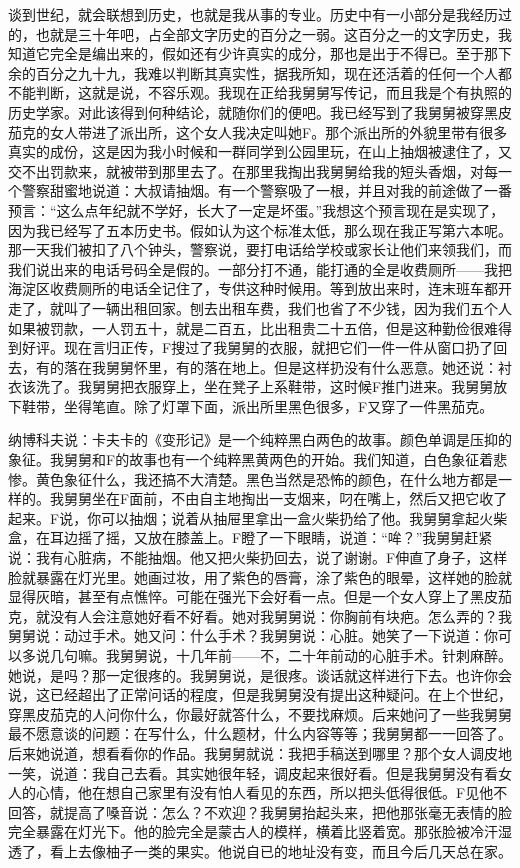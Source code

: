 谈到世纪，就会联想到历史，也就是我从事的专业。历史中有一小部分是我经历过的，也就是三十年吧，占全部文字历史的百分之一弱。这百分之一的文字历史，我知道它完全是编出来的，假如还有少许真实的成分，那也是出于不得已。至于那下余的百分之九十九，我难以判断其真实性，据我所知，现在还活着的任何一个人都不能判断，这就是说，不容乐观。我现在正给我舅舅写传记，而且我是个有执照的历史学家。对此该得到何种结论，就随你们的便吧。我已经写到了我舅舅被穿黑皮茄克的女人带进了派出所，这个女人我决定叫她F。那个派出所的外貌里带有很多真实的成份，这是因为我小时候和一群同学到公园里玩，在山上抽烟被逮住了，又交不出罚款来，就被带到那里去了。在那里我掏出我舅舅给我的短头香烟，对每一个警察甜蜜地说道：大叔请抽烟。有一个警察吸了一根，并且对我的前途做了一番预言：“这么点年纪就不学好，长大了一定是坏蛋。”我想这个预言现在是实现了，因为我已经写了五本历史书。假如认为这个标准太低，那么现在我正写第六本呢。那一天我们被扣了八个钟头，警察说，要打电话给学校或家长让他们来领我们，而我们说出来的电话号码全是假的。一部分打不通，能打通的全是收费厕所——我把海淀区收费厕所的电话全记住了，专供这种时候用。等到放出来时，连末班车都开走了，就叫了一辆出租回家。刨去出租车费，我们也省了不少钱，因为我们五个人如果被罚款，一人罚五十，就是二百五，比出租贵二十五倍，但是这种勤俭很难得到好评。现在言归正传，F搜过了我舅舅的衣服，就把它们一件一件从窗口扔了回去，有的落在我舅舅怀里，有的落在地上。但是这样扔没有什么恶意。她还说：衬衣该洗了。我舅舅把衣服穿上，坐在凳子上系鞋带，这时候F推门进来。我舅舅放下鞋带，坐得笔直。除了灯罩下面，派出所里黑色很多，F又穿了一件黑茄克。 

纳博科夫说：卡夫卡的《变形记》是一个纯粹黑白两色的故事。颜色单调是压抑的象征。我舅舅和F的故事也有一个纯粹黑黄两色的开始。我们知道，白色象征着悲惨。黄色象征什么，我还搞不大清楚。黑色当然是恐怖的颜色，在什么地方都是一样的。我舅舅坐在F面前，不由自主地掏出一支烟来，叼在嘴上，然后又把它收了起来。F说，你可以抽烟；说着从抽屉里拿出一盒火柴扔给了他。我舅舅拿起火柴盒，在耳边摇了摇，又放在膝盖上。F瞪了一下眼睛，说道：“哞？”我舅舅赶紧说：我有心脏病，不能抽烟。他又把火柴扔回去，说了谢谢。F伸直了身子，这样脸就暴露在灯光里。她画过妆，用了紫色的唇膏，涂了紫色的眼晕，这样她的脸就显得灰暗，甚至有点憔悴。可能在强光下会好看一点。但是一个女人穿上了黑皮茄克，就没有人会注意她好看不好看。她对我舅舅说：你胸前有块疤。怎么弄的？我舅舅说：动过手术。她又问：什么手术？我舅舅说：心脏。她笑了一下说道：你可以多说几句嘛。我舅舅说，十几年前——不，二十年前动的心脏手术。针刺麻醉。她说，是吗？那一定很疼的。我舅舅说，是很疼。谈话就这样进行下去。也许你会说，这已经超出了正常问话的程度，但是我舅舅没有提出这种疑问。在上个世纪，穿黑皮茄克的人问你什么，你最好就答什么，不要找麻烦。后来她问了一些我舅舅最不愿意谈的问题：在写什么，什么题材，什么内容等等；我舅舅都一一回答了。后来她说道，想看看你的作品。我舅舅就说：我把手稿送到哪里？那个女人调皮地一笑，说道：我自己去看。其实她很年轻，调皮起来很好看。但是我舅舅没有看女人的心情，他在想自己家里有没有怕人看见的东西，所以把头低得很低。F见他不回答，就提高了嗓音说：怎么？不欢迎？我舅舅抬起头来，把他那张毫无表情的脸完全暴露在灯光下。他的脸完全是蒙古人的模样，横着比竖着宽。那张脸被冷汗湿透了，看上去像柚子一类的果实。他说自已的地址没有变，而且今后几天总在家。 

